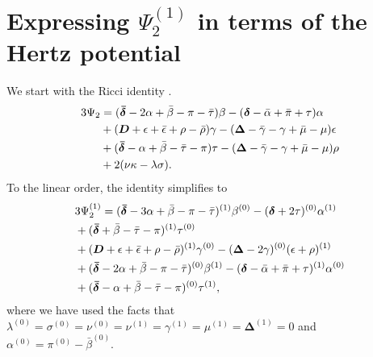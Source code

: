 \documentclass[aps,prd,amsmath,floats,floatfix, twocolumn,
superscriptaddress,nofootinbib,showpacs]{revtex4-1}
\begin{document}
\section{\texorpdfstring{Expressing $\Psi_2^{(1)}$ in terms of the Hertz potential}{Derivation of psi2}}
\label{app:psi2_hertz}
We start with the Ricci identity \cite{chandrasekhar1998mathematical}.
\begin{align}
    3\Psi_2&=(\bm{\bar{\delta}}-2\alpha+\bar{\beta}-\pi-\bar{\tau})\beta-(\bm{\delta}-\bar{\alpha}+\bar{\pi}+\tau)\alpha \notag \\
    &+(\bm{D}+\epsilon+\bar{\epsilon}+\rho-\bar{\rho})\gamma-(\bm{\Delta}-\bar{\gamma}-\gamma+\bar{\mu}-\mu)\epsilon \notag \\
    &+(\bm{\bar{\delta}}-\alpha+\bar{\beta}-\bar{\tau}-\pi)\tau-(\bm{\Delta}-\bar{\gamma}-\gamma+\bar{\mu}-\mu)\rho \notag \\
    &+2(\nu\kappa-\lambda\sigma).
\end{align}
To the linear order, the identity simplifies to 
\begin{align}
    &3\Psi_2^{(1)}=(\bm{\bar{\delta}}-3\alpha+\bar{\beta}-\pi-\bar{\tau})^{(1)}\beta^{(0)} -(\bm{\delta}+2\tau)^{(0)}\alpha^{(1)} \notag \\
    & +(\bm{\bar{\delta}}+\bar{\beta}-\bar{\tau}-\pi)^{(1)}\tau^{(0)} \notag \\
    &+(\bm{D}+\epsilon+\bar{\epsilon}+\rho-\bar{\rho})^{(1)}\gamma^{(0)}-(\bm{\Delta} -2\gamma)^{(0)}(\epsilon+\rho)^{(1)}\notag \\
    &+(\bm{\bar{\delta}}-2\alpha+\bar{\beta}-\pi-\bar{\tau})^{(0)}\beta^{(1)}-(\bm{\delta}-\bar{\alpha}+\bar{\pi}+\tau)^{(1)}\alpha^{(0)}\notag \\
    &+(\bm{\bar{\delta}}-\alpha+\bar{\beta}-\bar{\tau}-\pi)^{(0)}\tau^{(1)},  \label{eq:linearized_psi2_middle}
\end{align}
where we have used the facts that $\lambda^{(0)}=\sigma^{(0)}=\nu^{(0)}=\nu^{(1)}=\gamma^{(1)}=\mu^{(1)}=\bm{\Delta}^{(1)}=0$ and $\alpha^{(0)}=\pi^{(0)}-\bar{\beta}^{(0)}$.
\end{document}
